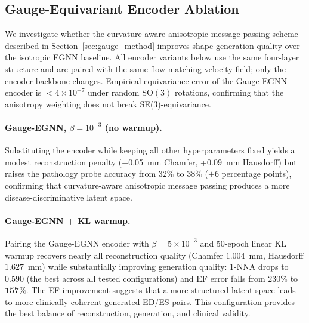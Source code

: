 \documentclass{article}
\begin{document}
\subsection{Gauge-Equivariant Encoder Ablation}
\label{sec:gauge_ablation}

We investigate whether the curvature-aware anisotropic message-passing
scheme described in Section~\ref{sec:gauge_method} improves shape
generation quality over the isotropic EGNN baseline.
All encoder variants below use the same four-layer structure and are
paired with the same flow matching velocity field; only the encoder
backbone changes.
Empirical equivariance error of the Gauge-EGNN encoder is $<4\times
10^{-7}$ under random $\mathrm{SO}(3)$ rotations, confirming that the
anisotropy weighting does not break SE(3)-equivariance.

\paragraph{Gauge-EGNN, $\beta{=}10^{-3}$ (no warmup).}
Substituting the encoder while keeping all other hyperparameters fixed
yields a modest reconstruction penalty (+0.05~mm Chamfer, +0.09~mm
Hausdorff) but raises the pathology probe accuracy from $32\%$ to $38\%$
($+6$ percentage points), confirming that curvature-aware anisotropic
message passing produces a more disease-discriminative latent space.

\paragraph{Gauge-EGNN + KL warmup.}
Pairing the Gauge-EGNN encoder with $\beta{=}5{\times}10^{-3}$ and 50-epoch
linear KL warmup recovers nearly all reconstruction quality (Chamfer
$1.004$~mm, Hausdorff $1.627$~mm) while substantially improving generation
quality: 1-NNA drops to $\mathbf{0.590}$ (the best across all tested
configurations) and EF error falls from $230\%$ to $\mathbf{157\%}$.
The EF improvement suggests that a more structured latent space leads to
more clinically coherent generated ED/ES pairs.
This configuration provides the best balance of reconstruction, generation,
and clinical validity.
\end{document}
